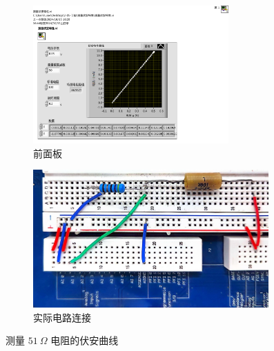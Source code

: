 \documentclass[UTF8]{article}
\theoremstyle{MyLineTheoremStyle} %
\theoremstyle{MyBlockTheoremStyle} %
\theoremstyle{MySubsubsectionStyle} %
\begin{document}
\begin{figure}[H]\centering
\begin{subfigure}[b]{0.45\columnwidth}\centering
    \includegraphics[height=150pt]{assets/测量伏安曲线__50欧电阻.pdf}
    \caption{前面板}
\end{subfigure}\hfill
\begin{subfigure}[b]{0.55\columnwidth}\centering
    \includegraphics[height=150pt]{assets/测量伏安曲线__50欧电阻.jpg}
    \caption{实际电路连接}
\end{subfigure}
\caption{测量 $51 \ \Omega$ 电阻的伏安曲线}
\label{测量51欧电阻的伏安曲线}
\end{figure}
\end{document}
